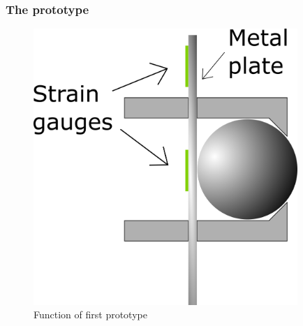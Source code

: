 \subsubsection{The prototype}

\begin{figure}[H]
\begin{center}
	\includegraphics[width = 10cm]{Figures/Press_sens_func_1.png}
	\caption{Function of first prototype}
	\label{Press_sens_prot_1}
\end{center}
\end{figure}

